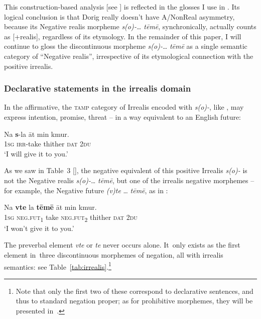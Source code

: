 \documentclass[output=paper,colorlinks,citecolor=brown,draft]{langscibook}
\begin{document}
This construction-based analysis [see ] is reflected in the glosses I use in . Its logical conclusion is that Dorig really doesn’t have A/NonReal asymmetry, because its Negative realis morpheme \textit{s(o)‑… tēmē}, synchronically, actually counts as [+realis], regardless of its etymology. In the remainder of this paper, I will continue to gloss the discontinuous morpheme \textit{s(o)-}… \textit{tēmē} as a single \mbox{semantic} category of “Negative realis”, irrespective of its etymological connection with the positive irrealis.

\subsubsection{Declarative statements in the irrealis domain}\label{sec:dor:2.1.6}

In the affirmative, the \textsc{tamp} category of Irrealis encoded with \textit{s(o)-}, like , may express intention, promise, threat – in a way equivalent to an English future:

\ea\label{ex:dor:give}
     \gll  Na \textbf{s}-la āt min kmur.\\ 
              \textsc{1sg} \textsc{irr}-take thither \textsc{dat} \textsc{2du}\\
     \glt ‘I will give it to you.’ \quad [\textsc{af.bp3}.29a]
\z

As we saw in Table~3 [], the negative equivalent of this positive Irrealis \textit{s(o)-} is not the Negative realis \textit{s(o)-}… \textit{tēmē}, but one of the irrealis negative morphemes – for example, the Negative future \textit{(v)te} … \textit{tēmē}, as in :

\ea\label{ex:dor:wontgive}
    \gll   Na \textbf{vte} la \textbf{tēmē} āt min kmur.\\
              \textsc{1sg} \textsc{neg.fut\textsubscript{1}} take \textsc{neg.fut\textsubscript{2}} thither \textsc{dat} \textsc{2du}\\
    \glt ‘I won’t give it to you.’  \quad [\textsc{af.bp3}.29b]
\z 

The preverbal element \textit{vte} or \textit{te} never occurs alone. It~only exists as the first ele\-ment in~three discontinuous morphemes of negation, all with irrealis \mbox{semantics}: see Table~\ref{tab:irrealis}.\footnote{Note that only the first two of these correspond to declarative sentences, and thus to standard negation proper; as for prohibitive morphemes, they will be presented in~.}
\end{document}
